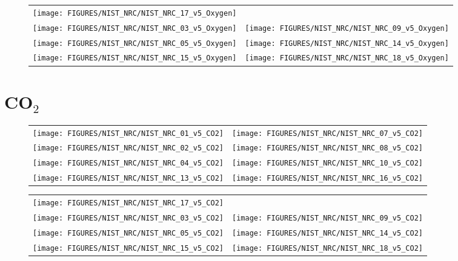 \begin{figure}[p]
\begin{tabular*}{\textwidth}{l@{\extracolsep{\fill}}r}
\texttt{[image: FIGURES/NIST\_NRC/NIST\_NRC\_17\_v5\_Oxygen]} &
 \\
\texttt{[image: FIGURES/NIST\_NRC/NIST\_NRC\_03\_v5\_Oxygen]} &
\texttt{[image: FIGURES/NIST\_NRC/NIST\_NRC\_09\_v5\_Oxygen]} \\
\texttt{[image: FIGURES/NIST\_NRC/NIST\_NRC\_05\_v5\_Oxygen]} &
\texttt{[image: FIGURES/NIST\_NRC/NIST\_NRC\_14\_v5\_Oxygen]} \\
\texttt{[image: FIGURES/NIST\_NRC/NIST\_NRC\_15\_v5\_Oxygen]} &
\texttt{[image: FIGURES/NIST\_NRC/NIST\_NRC\_18\_v5\_Oxygen]}
\end{tabular*}
\label{NIST_NRC_Gas_Open}
\end{figure}

\clearpage

\section{CO$_2$}



\begin{figure}[p]
\begin{tabular*}{\textwidth}{l@{\extracolsep{\fill}}r}
\texttt{[image: FIGURES/NIST\_NRC/NIST\_NRC\_01\_v5\_CO2]} &
\texttt{[image: FIGURES/NIST\_NRC/NIST\_NRC\_07\_v5\_CO2]} \\
\texttt{[image: FIGURES/NIST\_NRC/NIST\_NRC\_02\_v5\_CO2]} &
\texttt{[image: FIGURES/NIST\_NRC/NIST\_NRC\_08\_v5\_CO2]} \\
\texttt{[image: FIGURES/NIST\_NRC/NIST\_NRC\_04\_v5\_CO2]} &
\texttt{[image: FIGURES/NIST\_NRC/NIST\_NRC\_10\_v5\_CO2]} \\
\texttt{[image: FIGURES/NIST\_NRC/NIST\_NRC\_13\_v5\_CO2]} &
\texttt{[image: FIGURES/NIST\_NRC/NIST\_NRC\_16\_v5\_CO2]}
\end{tabular*}
\end{figure}

\begin{figure}[p]
\begin{tabular*}{\textwidth}{l@{\extracolsep{\fill}}r}
\texttt{[image: FIGURES/NIST\_NRC/NIST\_NRC\_17\_v5\_CO2]} &
 \\
\texttt{[image: FIGURES/NIST\_NRC/NIST\_NRC\_03\_v5\_CO2]} &
\texttt{[image: FIGURES/NIST\_NRC/NIST\_NRC\_09\_v5\_CO2]} \\
\texttt{[image: FIGURES/NIST\_NRC/NIST\_NRC\_05\_v5\_CO2]} &
\texttt{[image: FIGURES/NIST\_NRC/NIST\_NRC\_14\_v5\_CO2]} \\
\texttt{[image: FIGURES/NIST\_NRC/NIST\_NRC\_15\_v5\_CO2]} &
\texttt{[image: FIGURES/NIST\_NRC/NIST\_NRC\_18\_v5\_CO2]}
\end{tabular*}
\end{figure}

